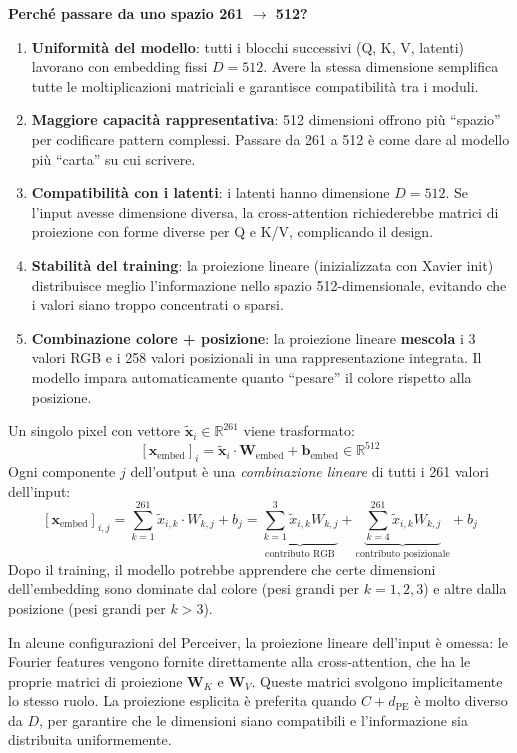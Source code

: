 \documentclass[12pt,a4paper]{article}
\begin{document}
\textbf{Perch\'e passare da uno spazio 261 $\to$ 512?}
\begin{enumerate}
    \item \textbf{Uniformit\`a del modello}: tutti i blocchi successivi (Q, K, V, latenti) lavorano con embedding fissi $D = 512$. Avere la stessa dimensione semplifica tutte le moltiplicazioni matriciali e garantisce compatibilit\`a tra i moduli.
    \item \textbf{Maggiore capacit\`a rappresentativa}: 512 dimensioni offrono pi\`u ``spazio'' per codificare pattern complessi. Passare da 261 a 512 \`e come dare al modello pi\`u ``carta'' su cui scrivere.
    \item \textbf{Compatibilit\`a con i latenti}: i latenti hanno dimensione $D = 512$. Se l'input avesse dimensione diversa, la cross-attention richiederebbe matrici di proiezione con forme diverse per Q e K/V, complicando il design.
    \item \textbf{Stabilit\`a del training}: la proiezione lineare (inizializzata con Xavier init) distribuisce meglio l'informazione nello spazio 512-dimensionale, evitando che i valori siano troppo concentrati o sparsi.
    \item \textbf{Combinazione colore + posizione}: la proiezione lineare \textbf{mescola} i 3 valori RGB e i 258 valori posizionali in una rappresentazione integrata. Il modello impara automaticamente quanto ``pesare'' il colore rispetto alla posizione.
\end{enumerate}

\begin{examplebox}
Un singolo pixel con vettore $\tilde{\mathbf{x}}_i \in \mathbb{R}^{261}$ viene trasformato:
\[
    [\mathbf{x}_{\text{embed}}]_i = \tilde{\mathbf{x}}_i \cdot \mathbf{W}_{\text{embed}} + \mathbf{b}_{\text{embed}} \in \mathbb{R}^{512}
\]
Ogni componente $j$ dell'output \`e una \emph{combinazione lineare} di tutti i 261 valori dell'input:
\[
    [\mathbf{x}_{\text{embed}}]_{i,j} = \sum_{k=1}^{261} \tilde{x}_{i,k} \cdot W_{k,j} + b_j = \underbrace{\sum_{k=1}^{3} \tilde{x}_{i,k} W_{k,j}}_{\text{contributo RGB}} + \underbrace{\sum_{k=4}^{261} \tilde{x}_{i,k} W_{k,j}}_{\text{contributo posizionale}} + b_j
\]
Dopo il training, il modello potrebbe apprendere che certe dimensioni dell'embedding sono dominate dal colore (pesi grandi per $k = 1, 2, 3$) e altre dalla posizione (pesi grandi per $k > 3$).
\end{examplebox}

\begin{notabox}
In alcune configurazioni del Perceiver, la proiezione lineare dell'input \`e omessa: le Fourier features vengono fornite direttamente alla cross-attention, che ha le proprie matrici di proiezione $\mathbf{W}_K$ e $\mathbf{W}_V$. Queste matrici svolgono implicitamente lo stesso ruolo. La proiezione esplicita \`e preferita quando $C + d_{\text{PE}}$ \`e molto diverso da $D$, per garantire che le dimensioni siano compatibili e l'informazione sia distribuita uniformemente.
\end{notabox}
\end{document}
